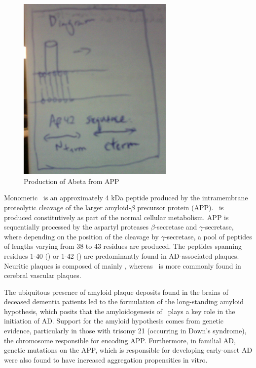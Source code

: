 \begin{figure}
\centering
\includegraphics[width=3in]{figures/introduction/AD_abeta_app.png}
\caption[Abeta production]{Production of Abeta from APP}
\label{fig:AD_abeta_app}
\end{figure}

Monomeric \abeta\ is an approximately 4 kDa peptide produced by the intramembrane proteolytic cleavage of the larger amyloid-$\beta$ precursor protein (APP).  \abeta\ is produced constitutively as part of the normal cellular metabolism.\cite{Hardy:2002dh} APP is sequentially processed by the aspartyl proteases $\beta$-secretase and $\gamma$-secretase, where depending on the position of the cleavage by $\gamma$-secretase, a pool of \abeta peptides of lengths varying from 38 to 43 residues are produced. The peptides spanning residues 1-40 (\abetaforty) or 1-42 (\abetafortytwo) are predominantly found in AD-associated plaques. Neuritic plaques is composed of mainly \abetafortytwo, whereas \abetaforty\ is more commonly found in cerebral vascular plaques.

The ubiquitous presence of amyloid plaque deposits found in the brains of deceased dementia patients led to the formulation of the long-standing amyloid hypothesis, which posits that the amyloidogenesis of \abeta\ plays a key role in the initiation of AD.\cite{Hardy:2002dh} Support for the amyloid hypothesis comes from genetic evidence, particularly in those with trisomy 21 (occurring in Down's syndrome), the chromosome responsible for encoding APP. Furthermore, in familial AD, genetic mutations on the APP, which is responsible for developing early-onset AD were also found to have increased aggregation propensities in vitro. %

